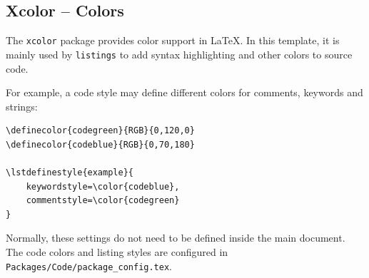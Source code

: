\subsection{Xcolor -- Colors}

The \texttt{xcolor} package provides color support in \LaTeX. In this
template, it is mainly used by \texttt{listings} to add syntax
highlighting and other colors to source code.

For example, a code style may define different colors for comments,
keywords and strings:

\begin{lstlisting}[style=latex]
\definecolor{codegreen}{RGB}{0,120,0}
\definecolor{codeblue}{RGB}{0,70,180}

\lstdefinestyle{example}{
    keywordstyle=\color{codeblue},
    commentstyle=\color{codegreen}
}
\end{lstlisting}

Normally, these settings do not need to be defined inside the main
document. The code colors and listing styles are configured in
\texttt{Packages/Code/package\_config.tex}.